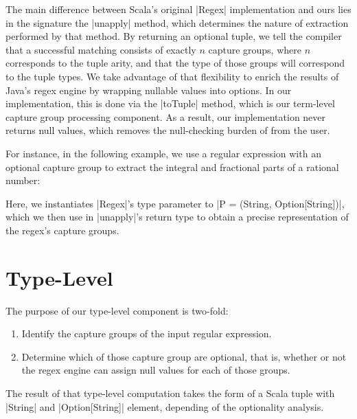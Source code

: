 The main difference between Scala's original |Regex| implementation and ours lies in the signature the |unapply| method, which determines the nature of extraction performed by that method.
By returning an optional tuple, we tell the compiler that a successful matching consists of exactly $n$ capture groups, where $n$ corresponds to the tuple arity, and that the type of those groups will correspond to the tuple types.
We take advantage of that flexibility to enrich the results of Java's regex engine by wrapping nullable values into options.
In our implementation, this is done via the |toTuple| method, which is our
term-level capture group processing component.
As a result, our implementation never returns null values, which removes the null-checking burden of from the user.

For instance, in the following example, we use a regular expression with an optional capture group to extract the integral and fractional parts of a rational number:

\regexRational

\noindent
Here, we instantiates |Regex|'s type parameter to |P = (String, Option[String])|, which we then use in |unapply|'s return type to obtain a precise representation of the regex's capture groups.

\section{Type-Level}
\label{sec:type-level}

The purpose of our type-level component is two-fold:

\begin{enumerate}
  \item Identify the capture groups of the input regular expression.
  \item Determine which of those capture group are optional, that is, whether or not the regex engine can assign null values for each of those groups.
\end{enumerate}

\noindent
The result of that type-level computation takes the form of a Scala tuple with |String| and |Option[String]| element, depending of the optionality analysis.

